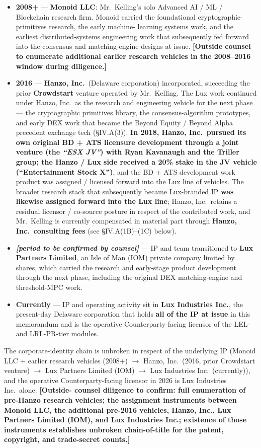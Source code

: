 \documentclass[11pt,letterpaper]{article}
\begin{document}
\begin{itemize}[leftmargin=2em,itemsep=0.1em]
\item \textbf{2008+} --- \textbf{Monoid LLC}: Mr.\ Kelling's solo
Advanced AI / ML / Blockchain research firm. Monoid carried the
foundational cryptographic-primitives research, the early machine-
learning systems work, and the earliest distributed-systems
engineering work that subsequently fed forward into the consensus and
matching-engine designs at issue. \textbf{[Outside counsel to enumerate
additional earlier research vehicles in the 2008--2016 window during
diligence.]}
\item \textbf{2016} --- \textbf{Hanzo, Inc.}\ (Delaware corporation)
incorporated, succeeding the prior \textbf{Crowdstart} venture
operated by Mr.\ Kelling. The Lux work continued under Hanzo, Inc.\ as
the research and engineering vehicle for the next phase --- the
cryptographic primitives library, the consensus-algorithm prototypes,
and early DEX work that became the Beyond Equity / Beyond Alpha
precedent exchange tech (\S IV.A(3)). \textbf{In 2018, Hanzo, Inc.\
pursued its own original BD + ATS licensure development through a
joint venture (the \emph{``ESX JV''}) with Ryan Kavanaugh and the
Triller group; the Hanzo / Lux side received a 20\% stake in the
JV vehicle (``Entertainment Stock X'')}, and the BD + ATS
development work product was assigned / licensed forward into the
Lux line of vehicles. The broader research stack that subsequently
became Lux-branded IP \textbf{was likewise assigned forward into the
Lux line}; Hanzo, Inc.\ retains a residual licensor / co-source
posture in respect of the contributed work, and Mr.\ Kelling is
currently compensated in material part through \textbf{Hanzo, Inc.\
consulting fees} (see \S IV.A(1B)--(1C) below).
\item \textbf{\emph{[period to be confirmed by counsel]}} --- IP
and team transitioned to \textbf{Lux Partners Limited}, an Isle of
Man (IOM) private company limited by shares, which carried the
research and early-stage product development through the next phase,
including the original DEX matching-engine and threshold-MPC work.
\item \textbf{Currently} --- IP and operating activity sit in
\textbf{Lux Industries Inc.}, the present-day Delaware corporation
that holds \textbf{all of the IP at issue} in this memorandum and
is the operative Counterparty-facing licensor of the LEL- and
LRL-PR-tier modules.
\end{itemize}
The corporate-identity chain is unbroken in respect of the
underlying IP (Monoid LLC + earlier research vehicles (2008+)
$\rightarrow$ Hanzo, Inc.\ (2016, prior Crowdstart venture)
$\rightarrow$ Lux Partners Limited (IOM) $\rightarrow$ Lux
Industries Inc.\ (currently)), and the operative Counterparty-facing
licensor in 2026 is Lux Industries Inc.\ alone. \textbf{[Outside-
counsel diligence to confirm: full enumeration of pre-Hanzo research
vehicles; the assignment instruments between Monoid LLC, the
additional pre-2016 vehicles, Hanzo, Inc., Lux Partners Limited
(IOM), and Lux Industries Inc.; existence of those instruments
establishes unbroken chain-of-title for the patent, copyright, and
trade-secret counts.]}
\end{document}
